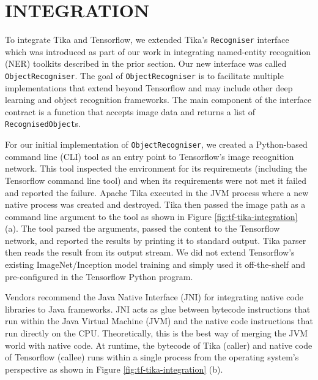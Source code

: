 
\section{INTEGRATION} \label{sec:integration}
To integrate Tika and Tensorflow, we extended Tika's \texttt{Recogniser} interface which was introduced as part of our work in integrating named-entity recognition (NER) toolkits described in the prior section. Our new interface was called \texttt{ObjectRecogniser}. The goal of \texttt{ObjectRecogniser} is to facilitate multiple implementations that extend beyond Tensorflow and may include other deep learning and object recognition frameworks. The main component of the interface contract is a function that accepts image data and returns a list of \texttt{RecognisedObject}s.

For our initial implementation of \texttt{ObjectRecogniser}, we created a Python-based command line (CLI) tool as an entry point to Tensorflow's image recognition network. This tool inspected the environment for its requirements (including the Tensorflow command line tool) and when its requirements were not met it failed and reported the failure. Apache Tika executed in the JVM process where a new native process was created and destroyed. Tika then passed the image path as a command line argument to the tool as shown in Figure \ref{fig:tf-tika-integration} (a). The tool parsed the arguments, passed the content to the Tensorflow network, and reported the results by printing it to standard output. Tika parser then reads the result from its output stream. We did not extend Tensorflow's existing ImageNet/Inception model training and simply used it off-the-shelf and pre-configured in the Tensorflow Python program.

Vendors recommend the Java Native Interface (JNI) for integrating native code libraries to Java frameworks\cite{gordon1998essential}. JNI acts as glue between bytecode instructions that run within the Java Virtual Machine (JVM) and the native code instructions that run directly on the CPU. Theoretically, this is the best way of merging the JVM world with native code. At runtime, the bytecode of Tika (caller) and native code of Tensorflow (callee) runs within a single process from the operating system's perspective as shown in Figure \ref{fig:tf-tika-integration} (b).

